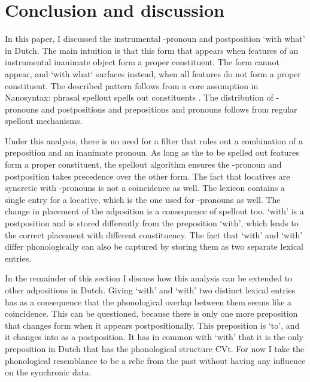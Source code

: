 \documentclass[12pt]{article}
\begin{document}
\section{Conclusion and discussion}\label{sec:conclusion}

In this paper, I discussed the instrumental -pronoun and postposition  `with what' in Dutch. The main intuition is that this form that appears when features of an instrumental inanimate object form a proper constituent. The form cannot appear, and  `with what` surfaces instead, when all features do not form a proper constituent. The described pattern follows from a core assumption in Nanosyntax: phrasal spellout spells out constituents \citep{starke2009}. The distribution of -pronouns and postpositions and prepositions and pronouns follows from regular spellout mechanisms.

Under this analysis, there is no need for a filter that rules out a combination of a preposition and an inanimate pronoun. As long as the to be spelled out features form a proper constituent, the spellout algorithm ensures the -pronoun and postposition takes precedence over the other form. The fact that locatives are syncretic with -pronouns is not a coincidence as well. The lexicon contains a single entry for a locative, which is the one used for -pronouns as well. The change in placement of the adposition is a consequence of spellout too.  `with' is a postposition and is stored differently from the preposition  `with', which leads to the correct placement with different constituency. The fact that  `with' and  `with' differ phonologically can also be captured by storing them as two separate lexical entries.

In the remainder of this section I discuss how this analysis can be extended to other adpositions in Dutch. Giving  `with' and  `with' two distinct lexical entries has as a consequence that the phonological overlap between them seems like a coincidence. This can be questioned, because there is only one more preposition that changes form when it appears postpositionally. This preposition is  `to', and it changes into  as a postposition. It has in common with  `with' that it is the only preposition in Dutch that has the phonological structure CVt. For now I take the phonological resemblance to be a relic from the past without having any influence on the synchronic data.
\end{document}
